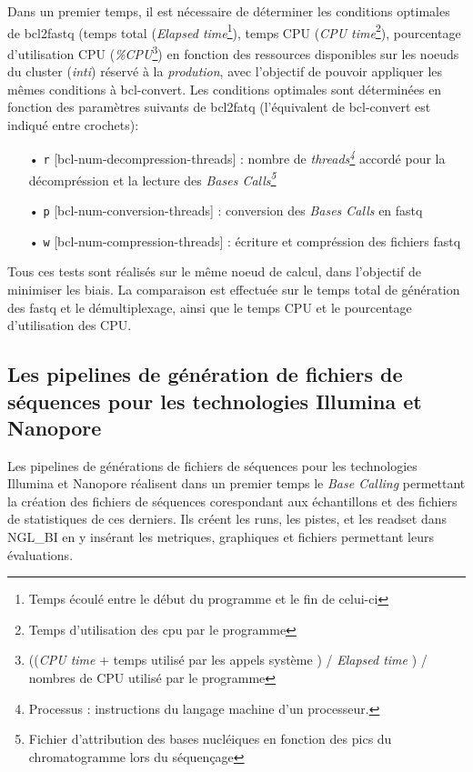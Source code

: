 Dans un premier temps, il est nécessaire de déterminer les conditions optimales de bcl2fastq (temps total (\emph{Elapsed time}\footnote{Temps écoulé entre le début du programme et le fin de celui-ci}), temps CPU (\emph{CPU time}\footnote{Temps d'utilisation des cpu par le programme}), pourcentage d'utilisation CPU (\emph{\%CPU}\footnote{((\emph{CPU time} + temps utilisé par les appels système ) / \emph{Elapsed time} ) / nombres de CPU utilisé par le programme}) en fonction des ressources disponibles sur les noeuds du cluster (\emph{inti}) réservé à la \emph{prodution}, avec l'objectif de pouvoir appliquer les mêmes conditions à bcl-convert. Les conditions optimales sont déterminées en fonction des paramètres suivants de bcl2fatq (l'équivalent de bcl-convert est indiqué entre crochets): \\
\begin{itemize}
    \item[•] \texttt{r} [bcl-num-decompression-threads] : nombre de \emph{threads\footnote{Processus : instructions du langage machine d'un processeur.}} accordé pour la décompréssion et la lecture des \emph{Bases Calls\footnote{Fichier d'attribution des bases nucléiques en fonction des pics du chromatogramme lors du séquençage}}
    \item[•] \texttt{p} [bcl-num-conversion-threads] : conversion des \emph{Bases Calls} en fastq
    \item[•] \texttt{w} [bcl-num-compression-threads] : écriture et compréssion des fichiers fastq\\
\end{itemize}

Tous ces tests sont réalisés sur le même noeud de calcul, dans l'objectif de minimiser les biais. La comparaison est effectuée sur le temps total de génération des fastq et le démultiplexage, ainsi que le temps CPU et le pourcentage d'utilisation des CPU.

\subsection{Les pipelines de génération de fichiers de séquences pour les technologies Illumina et Nanopore}
Les pipelines de générations de fichiers de séquences pour les technologies Illumina et Nanopore réalisent dans un premier temps le \emph{Base Calling} permettant la création des fichiers de séquences corespondant aux échantillons et des fichiers de statistiques de ces derniers. Ils créent les runs, les pistes, et les readset dans NGL\_BI en y insérant les metriques, graphiques et fichiers permettant leurs évaluations.\\


